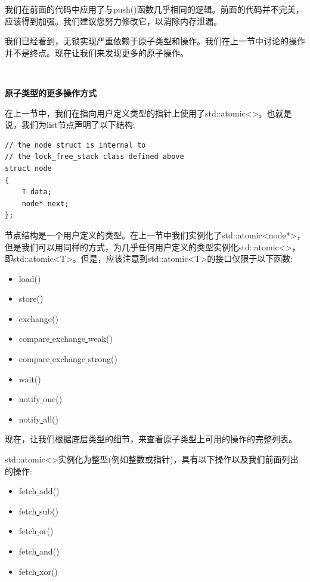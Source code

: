 我们在前面的代码中应用了与push()函数几乎相同的逻辑。前面的代码并不完美，应该得到加强。我们建议您努力修改它，以消除内存泄漏。 \par
我们已经看到，无锁实现严重依赖于原子类型和操作。我们在上一节中讨论的操作并不是终点。现在让我们来发现更多的原子操作。 \par

\noindent\textbf{}\ \par
\textbf{原子类型的更多操作方式} \ \par
在上一节中，我们在指向用户定义类型的指针上使用了std::atomic<>。也就是说，我们为list节点声明了以下结构: \par

\begin{lstlisting}[caption={}]
// the node struct is internal to
// the lock_free_stack class defined above
struct node
{
	T data;
	node* next;
};
\end{lstlisting}

节点结构是一个用户定义的类型。在上一节中我们实例化了std::atomic<node*>，但是我们可以用同样的方式，为几乎任何用户定义的类型实例化std::atomic<>，即std::atomic<T>。但是，应该注意到std::atomic<T>的接口仅限于以下函数: \par

\begin{itemize}
	\item load()
	\item store()
	\item exchange()
	\item compare\underline{ }exchange\underline{ }weak()
	\item compare\underline{ }exchange\underline{ }strong()
	\item wait()
	\item notify\underline{ }one()
	\item notify\underline{ }all()
\end{itemize}

现在，让我们根据底层类型的细节，来查看原子类型上可用的操作的完整列表。 \par
std::atomic<>实例化为整型(例如整数或指针)，具有以下操作以及我们前面列出的操作: \par

\begin{itemize}
	\item fetch\underline{ }add()
	\item fetch\underline{ }sub()
	\item fetch\underline{ }or()
	\item fetch\underline{ }and()
	\item fetch\underline{ }xor()
\end{itemize}

